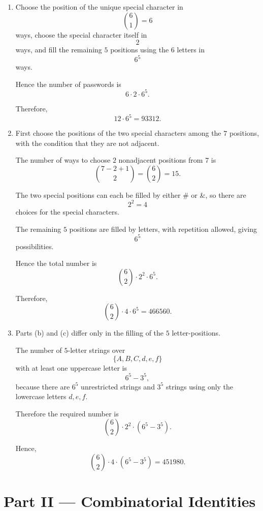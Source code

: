 \documentclass[12pt]{article}
\begin{document}
\begin{enumerate}[label=(\alph*)]
    \item Choose the position of the unique special character in
    \[
    \binom{6}{1}=6
    \]
    ways, choose the special character itself in
    \[
    2
    \]
    ways, and fill the remaining $5$ positions using the $6$ letters in
    \[
    6^5
    \]
    ways.

    Hence the number of passwords is
    \[
    6\cdot 2\cdot 6^5.
    \]

    Therefore,
    \[
    \boxed{12\cdot 6^5=93312}.
    \]

    \item First choose the positions of the two special characters among the $7$ positions, with the condition that they are not adjacent.

    The number of ways to choose $2$ nonadjacent positions from $7$ is
    \[
    \binom{7-2+1}{2}=\binom{6}{2}=15.
    \]

    The two special positions can each be filled by either \# or \&, so there are
    \[
    2^2=4
    \]
    choices for the special characters.

    The remaining $5$ positions are filled by letters, with repetition allowed, giving
    \[
    6^5
    \]
    possibilities.

    Hence the total number is
    \[
    \binom{6}{2}\cdot 2^2\cdot 6^5.
    \]

    Therefore,
    \[
    \boxed{\binom{6}{2}\cdot 4\cdot 6^5=466560}.
    \]

    \item Parts (b) and (c) differ only in the filling of the $5$ letter-positions.

    The number of $5$-letter strings over
    \[
    \{A,B,C,d,e,f\}
    \]
    with at least one uppercase letter is
    \[
    6^5-3^5,
    \]
    because there are $6^5$ unrestricted strings and $3^5$ strings using only the lowercase letters $d,e,f$.

    Therefore the required number is
    \[
    \binom{6}{2}\cdot 2^2\cdot (6^5-3^5).
    \]

    Hence,
    \[
    \boxed{\binom{6}{2}\cdot 4\cdot (6^5-3^5)=451980}.
    \]
\end{enumerate}

\newpage
\part{Part  II --- Combinatorial Identities}
\end{document}
